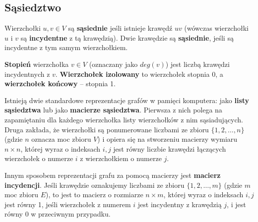 \subsection*{Sąsiedztwo}

Wierzchołki $u,v \in V$ są \textbf{sąsiednie} jeśli istnieje krawędź $uv$ (wówczas wierzchołki $u$ i $v$ są \textbf{incydentne} z tą krawędzią). Dwie krawędzie są \textbf{sąsiednie}, jeśli są incydentne z tym samym wierzchołkiem. 

\textbf{Stopień} wierzchołka $v \in V$ (oznaczany jako $deg(v)$) jest liczbą krawędzi incydentnych z $v$. \textbf{Wierzchołek izolowany} to wierzchołek stopnia 0, a \textbf{wierzchołek końcowy} -- stopnia 1.

Istnieją dwie standardowe reprezentacje grafów w pamięci komputera: jako \textbf{listy sąsiedztwa} lub jako \textbf{macierze sąsiedztwa}\cites[29]{banachowski}[600]{cormen}. Pierwsza z nich polega na zapamiętaniu dla każdego wierzchołka listy wierzchołków z nim sąsiadujących. Druga zakłada, że wierzchołki są ponumerowane liczbami ze zbioru $\{1, 2,\ldots,n\}$ (gdzie $n$ oznacza moc zbioru $V$) i opiera się na stworzeniu macierzy wymiaru $n \times n$, której wyraz o indeksach $i,j$ jest równy liczbie krawędzi łączących wierzchołek o numerze $i$ z wierzchołkiem o numerze $j$.

Innym sposobem reprezentacji grafu za pomocą macierzy jest \textbf{macierz incydencji}. Jeśli krawędzie oznakujemy liczbami ze zbioru $\{1,2,\ldots,m\}$ (gdzie $m$ moc zbioru $E$), to jest to macierz o rozmiarze $n \times m$, której wyraz o indeksach $i,j$ jest równy 1, jeśli wierzchołek z numerem $i$ jest incydentny z krawędzią $j$, i jest równy 0 w przeciwnym przypadku\cite[27]{ross}.

\begin{figure}[H]
\centering
\caption{}\label{fig:graph-edge-labeled}
\end{figure}

